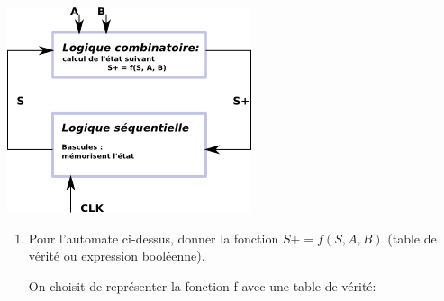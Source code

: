 \documentclass[a4paper,10pt]{exam}
\begin{document}
\begin{center}
\includegraphics{TD9-automate}
\end{center}
\begin{enumerate}
  \item Pour l'automate ci-dessus, donner la fonction $S+ = f(S, A, B)$ (table de
    vérité ou expression booléenne).
    \begin{solution}

      On choisit de représenter la fonction f avec une table de vérité:


\end{solution}
\end{enumerate}
\end{document}
